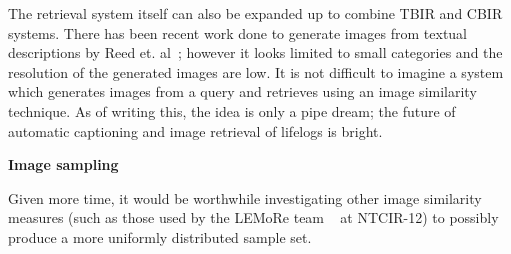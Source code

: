 The retrieval system itself can also be expanded up to combine TBIR and CBIR systems. There has been recent work done to generate images from textual descriptions by Reed et. al~\cite{reed2016generative}; however it looks limited to small categories and the resolution of the generated images are low. It is not difficult to imagine a system which generates images from a query and retrieves using an image similarity technique. As of writing this, the idea is only a pipe dream; the future of automatic captioning and image retrieval of lifelogs is bright.

\textbf{Image sampling}

Given more time, it would be worthwhile investigating other image similarity measures (such as those used by the LEMoRe team ~\cite{de40lemore} at NTCIR-12) to possibly produce a more uniformly distributed sample set.

 
 

